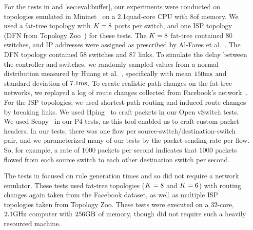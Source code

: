 For the tests in  and
\ref{sec:eval:buffer}, our
experiments were conducted on topologies emulated in Mininet~\cite{Mininet} on a 2.1\gigahertz quad-core CPU with
8\gigabytes of memory.  We used a fat-tree topology with $K
= 8$ ports per switch, and one ISP topology (DFN from Topology Zoo~\cite{ISP}) for these tests.  The
$K = 8$ fat-tree contained $80$ switches, and
IP addresses were assigned as prescribed by Al-Fares et
al.~\cite{FatTree}.  The DFN topology contained 58 switches and 87
links.  To simulate the delay between the controller and switches, we
randomly sampled values from a normal distribution measured by Huang
et al.~\cite{switchSimulator}, specifically with mean $150\mathrm{ms}$ and
standard deviation of $7.1\mathrm{ms}$.  To create realistic path changes
on the fat-tree networks, we replayed a log of route changes collected
from Facebook's network~\cite{Facebookdata}.  For the ISP topologies,
we used shortest-path routing and induced route changes by breaking
links.  We used Hping~\cite{hping} to craft packets
in our Open vSwitch tests.  We used Scapy~\cite{Scapy} in our P4 tests, as this
tool enabled us to craft custom packet headers.  In our tests, there
was one flow per source-switch/destination-switch pair, and we
parameterized many of our tests by the packet-sending rate per flow.
So, for example, a rate of $1000$ packets per second indicates that
$1000$ packets flowed from each source switch to each other destination
switch per second.

\iffalse
We conducted experiments with both our P4 implementation and our Open
vSwitch implementation, which are described in \secref{sec:impl}.  One
element that differed between the P4 experiments and those with Open
vSwitch is that we were unable to support high packet-sending rates
with Open vSwitch, due to an implementation decision in the original
Open vSwitch codebase to create a new thread to handle each inbound
packet.  In our Mininet setup, this limited our ability to load the
network in the Open vSwitch experiments to $< 25\%$ of the load that
we could reasonably induce in the P4 experiments.
\fi

The tests in  focused on rule generation
times and so did not require a network emulator.  These tests used
fat-tree topologies ($K = 8$ and $K = 6$)
with routing changes again taken from the Facebook dataset, as well as
multiple ISP topologies taken from Topology Zoo.  These tests were
executed on a $32$-core, $2.1\textrm{GHz}$ computer with $256\textrm{GB}$ of
memory, though did not require such a heavily resourced machine.

